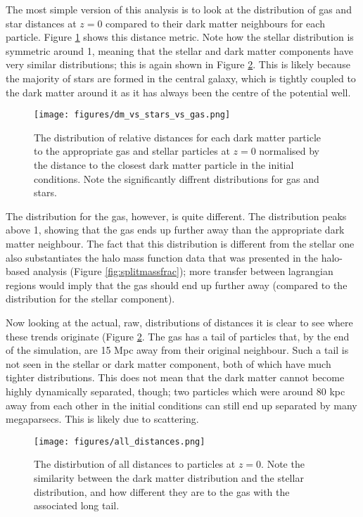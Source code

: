 The most simple version of this analysis is to look at the distribution of gas and star distances at $z=0$ compared to their dark matter neighbours for each particle. Figure \ref{fig:dmvsstarvsgas} shows this distance metric. Note how the stellar distribution is symmetric around 1, meaning that the stellar and dark matter components have very similar distributions; this is again shown in Figure \ref{fig:alldistances}. This is likely because the majority of stars are formed in the central galaxy, which is tightly coupled to the dark matter around it as it has always been the centre of the potential well.

\begin{figure}
    \centering
    \texttt{[image: figures/dm\_vs\_stars\_vs\_gas.png]}
    \caption{The distribution of relative distances for each dark matter particle to the appropriate gas and stellar particles at $z=0$ normalised by the distance to the closest dark matter particle in the initial conditions. Note the significantly diffrent distributions for gas and stars.}
    \label{fig:dmvsstarvsgas}
\end{figure}

The distribution for the gas, however, is quite different. The distribution peaks above 1, showing that the gas ends up further away than the appropriate dark matter neighbour. The fact that this distribution is different from the stellar one also substantiates the halo mass function data that was presented in the halo-based analysis (Figure \ref{fig:splitmassfrac}); more transfer between lagrangian regions would imply that the gas should end up further away (compared to the distribution for the stellar component).

Now looking at the actual, raw, distributions of distances it is clear to see where these trends originate (Figure \ref{fig:alldistances}. The gas has a tail of particles that, by the end of the simulation, are 15 Mpc away from their original neighbour. Such a tail is not seen in the stellar or dark matter component, both of which have much tighter distributions. This does not mean that the dark matter cannot become highly dynamically separated, though; two particles which were around 80 kpc away from each other in the initial conditions can still end up separated by many megaparsecs. This is likely due to scattering.

\begin{figure}
    \centering
    \texttt{[image: figures/all\_distances.png]}
    \caption{The distirbution of all distances to particles at $z=0$. Note the similarity between the dark matter distribution and the stellar distribution, and how different they are to the gas with the associated long tail.}
    \label{fig:alldistances}
\end{figure}

